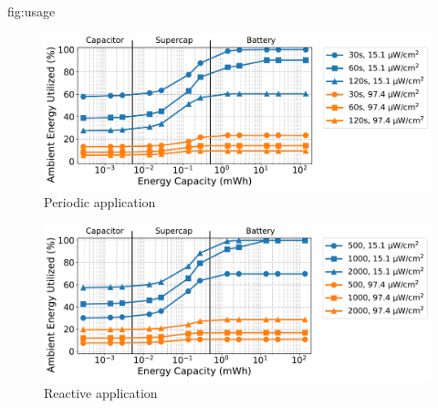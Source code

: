 \begin{definefigure*}{fig:usage}
  \centering
  \begin{subfigure}{0.49\textwidth}
    \centering
    \includegraphics[width=0.9\linewidth]{figs/capacity/sense_and_send/usage_vs_secondary_size}
    \caption{Periodic application}
    \label{fig:usage:sensesec}
  \end{subfigure}
  \begin{subfigure}{0.49\textwidth}
    \centering
    \includegraphics[width=0.9\linewidth]{figs/capacity/door_occupancy/usage_vs_secondary_size}
    \caption{Reactive application}
    \label{fig:usage:eventsec}
  \end{subfigure}
  \caption{\normalfont Ambient energy utilization
    as a function of idealized secondary storage capacity for different
    harvesting scenarios and workloads. The harvesting scenarios and workloads
    are described in \cref{sec:overview} and \cref{tab:rep}.  The x-axis is
    split by energy capacities possible with capacitors, supercapacitors, and
    batteries. The upper extents of capacity for (super)capacitors represent
    ten 100\,\si{\micro\farad} tantalum capacitors~\cite{tantalumDatasheet}, and one
    large 220\,mF supercapacitor~\cite{murataCap}. Larger capacitors exist, but
    are not appropriate for use on a small sensor node.  As energy storage increases, the harvestable energy used in
    the application also increases,
    implying
    increased application performance.  Some scenarios, such as the periodic
    30\,s, 15.1\,\uW/cm\textsuperscript{2} case, reach 100\% utilization at
}
\end{definefigure*}
